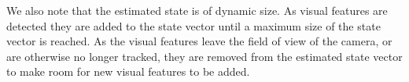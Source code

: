 


We also note
that the estimated state is of dynamic size. As visual features are
detected they are added to the state vector until a maximum size of the state
vector is reached. As the visual features leave the field of view of the camera,
or are otherwise no longer tracked, they are removed from the estimated state
vector to make room for new visual features to be added.

